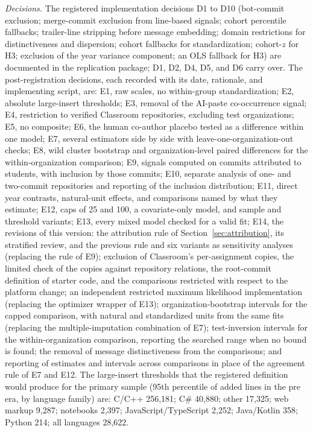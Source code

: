 \documentclass[acmsmall,screen,review,anonymous]{acmart}
\begin{document}
\textit{Decisions.} The registered implementation decisions D1 to D10 (bot-commit exclusion; merge-commit exclusion from line-based signals; cohort percentile fallbacks; trailer-line stripping before message embedding; domain restrictions for distinctiveness and dispersion; cohort fallbacks for standardization; cohort-$z$ for H3; exclusion of the year variance component; an OLS fallback for H3) are documented in the replication package; D1, D2, D4, D5, and D6 carry over. The post-registration decisions, each recorded with its date, rationale, and implementing script, are:
E1, raw scales, no within-group standardization;
E2, absolute large-insert thresholds;
E3, removal of the AI-paste co-occurrence signal;
E4, restriction to verified Classroom repositories, excluding test organizations;
E5, no composite;
E6, the human co-author placebo tested as a difference within one model;
E7, several estimators side by side with leave-one-organization-out checks;
E8, wild cluster bootstrap and organization-level paired differences for the within-organization comparison;
E9, signals computed on commits attributed to students, with inclusion by those commits;
E10, separate analysis of one- and two-commit repositories and reporting of the inclusion distribution;
E11, direct year contrasts, natural-unit effects, and comparisons named by what they estimate;
E12, caps of 25 and 100, a covariate-only model, and sample and threshold variants;
E13, every mixed model checked for a valid fit;
E14, the revisions of this version: the attribution rule of Section~\ref{sec:attribution}, its stratified review, and the previous rule and six variants as sensitivity analyses (replacing the rule of E9); exclusion of Classroom's per-assignment copies, the limited check of the copies against repository relations, the root-commit definition of starter code, and the comparisons restricted with respect to the platform change; an independent restricted maximum likelihood implementation (replacing the optimizer wrapper of E13); organization-bootstrap intervals for the capped comparison, with natural and standardized units from the same fits (replacing the multiple-imputation combination of E7); test-inversion intervals for the within-organization comparison, reporting the searched range when no bound is found; the removal of message distinctiveness from the comparisons; and reporting of estimates and intervals across comparisons in place of the agreement rule of E7 and E12.
The large-insert thresholds that the registered definition would produce for the primary sample (95th percentile of added lines in the pre era, by language family) are: C/C++ 256,181; C\# 40,880; other 17,325; web markup 9,287; notebooks 2,397; JavaScript/TypeScript 2,252; Java/Kotlin 358; Python 214; all languages 28,622.
\end{document}
